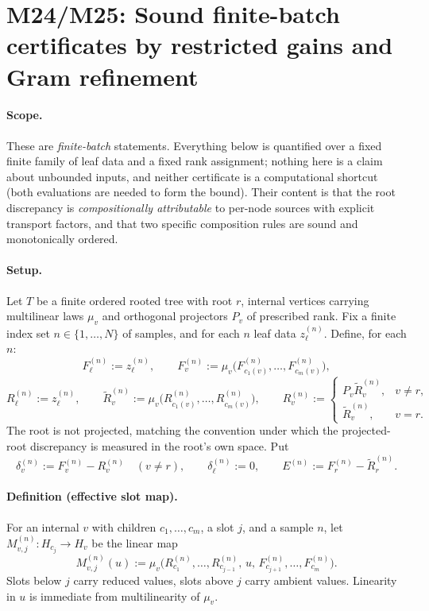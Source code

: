 \section*{M24/M25: Sound finite-batch certificates by restricted gains and Gram refinement}
\label{sec:m24-m25-finite-batch-certificates}

\paragraph{Scope.}
These are \emph{finite-batch} statements. Everything below is quantified over
a fixed finite family of leaf data and a fixed rank assignment; nothing here
is a claim about unbounded inputs, and neither certificate is a computational
shortcut (both evaluations are needed to form the bound). Their content is
that the root discrepancy is \emph{compositionally attributable} to per-node
sources with explicit transport factors, and that two specific composition
rules are sound and monotonically ordered.

\paragraph{Setup.}
Let $T$ be a finite ordered rooted tree with root $r$, internal vertices
carrying multilinear laws $\mu_v$ and orthogonal projectors $P_v$ of
prescribed rank. Fix a finite index set $n\in\{1,\dots,N\}$ of samples, and
for each $n$ leaf data $z_\ell^{(n)}$. Define, for each $n$:
\[
  F_\ell^{(n)}:=z_\ell^{(n)},\qquad
  F_v^{(n)}:=\mu_v\bigl(F_{c_1(v)}^{(n)},\dots,F_{c_m(v)}^{(n)}\bigr),
\]
\[
  R_\ell^{(n)}:=z_\ell^{(n)},\qquad
  \widetilde R_v^{(n)}:=\mu_v\bigl(R_{c_1(v)}^{(n)},\dots,R_{c_m(v)}^{(n)}\bigr),
  \qquad
  R_v^{(n)}:=
  \begin{cases}
    P_v\widetilde R_v^{(n)}, & v\ne r,\\
    \widetilde R_v^{(n)}, & v=r.
  \end{cases}
\]
The root is not projected, matching the convention under which the
projected-root discrepancy is measured in the root's own space. Put
\[
  \delta_v^{(n)}:=F_v^{(n)}-R_v^{(n)}\quad(v\ne r),
  \qquad
  \delta_\ell^{(n)}:=0,
  \qquad
  E^{(n)}:=F_r^{(n)}-\widetilde R_r^{(n)}.
\]

\paragraph{Definition (effective slot map).}
For an internal $v$ with children $c_1,\dots,c_m$, a slot $j$, and a sample
$n$, let $M_{v,j}^{(n)}:H_{c_j}\to H_v$ be the linear map
\[
  \boxed{\;
  M_{v,j}^{(n)}(u)
  :=\mu_v\bigl(R_{c_1}^{(n)},\dots,R_{c_{j-1}}^{(n)},\,u,\,
               F_{c_{j+1}}^{(n)},\dots,F_{c_m}^{(n)}\bigr).\;}
\tag{1}
\]
Slots below $j$ carry reduced values, slots above $j$ carry ambient values.
Linearity in $u$ is immediate from multilinearity of $\mu_v$.

